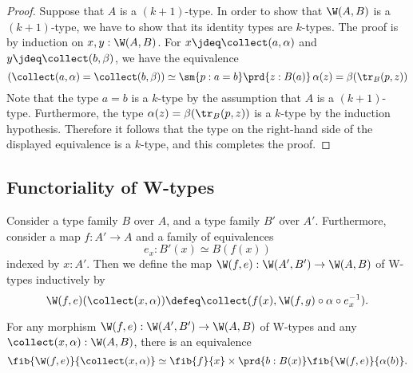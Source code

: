 \begin{proof}
  Suppose that $A$ is a $(k+1)$-type. In order to show that $\W(A,B)$ is a $(k+1)$-type, we have to show that its identity types are $k$-types. The proof is by induction on $x,y:\W(A,B)$. For $x\jdeq\collect(a,\alpha)$ and $y\jdeq\collect(b,\beta)$, we have the equivalence
  \begin{equation*}
    (\collect(a,\alpha)=\collect(b,\beta))\simeq\sm{p:a=b}\prd{z:B(a)}\,\alpha(z)=\beta(\tr_B(p,z))
  \end{equation*}
  Note that the type $a=b$ is a $k$-type by the assumption that $A$ is a $(k+1)$-type. Furthermore, the type $\alpha(z)=\beta(\tr_B(p,z))$ is a $k$-type by the induction hypothesis. Therefore it follows that the type on the right-hand side of the displayed equivalence is a $k$-type, and this completes the proof.
\end{proof}


\subsection{Functoriality of W-types}

\begin{defn}
  Consider a type family $B$ over $A$, and a type family $B'$ over $A'$. Furthermore, consider a map $f:A'\to A$ and a family of equivalences
  \begin{equation*}
    e_x:B'(x)\simeq B(f(x))
  \end{equation*}
  indexed by $x:A'$. Then we define the map $\W(f,e):\W(A',B')\to\W(A,B)$ of W-types inductively by
  \begin{equation*}
    \W(f,e)(\collect(x,\alpha))\defeq\collect(f(x),\W(f,g)\circ \alpha\circ e_x^{-1}).
  \end{equation*}
\end{defn}

\begin{lem}\label{lem:fib-W}
  For any morphism $\W(f,e):\W(A',B')\to\W(A,B)$ of W-types and any $\collect(x,\alpha):\W(A,B)$, there is an equivalence
  \begin{equation*}
    \fib{\W(f,e)}{\collect(x,\alpha)} \simeq \fib{f}{x}\times\prd{b:B(x)}\fib{\W(f,e)}{\alpha(b)}.
  \end{equation*}
\end{lem}

